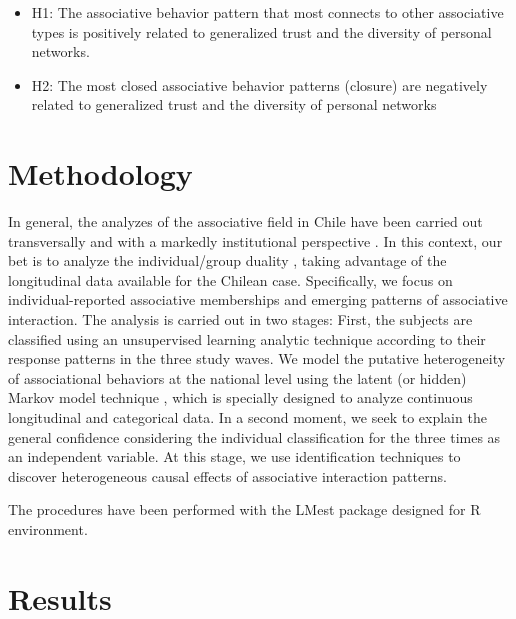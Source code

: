 \begin{itemize}
  \item H1: The associative behavior pattern that most connects to other associative types is positively related to generalized trust and the diversity of personal networks. 
  \item H2: The most closed associative behavior patterns (closure) are negatively related to generalized trust and the diversity of personal networks 
\end{itemize}





\section{Methodology}

In general, the analyzes of the associative field in Chile have been carried out transversally and with a markedly institutional perspective \parencite{irarrazaval_chile_2017,irarrazaval_sociedad_2017, programa_de_las_naciones_unidas_para_el_desarrollo_desarrollo_2000}. In this context, our bet is to analyze the individual/group duality \parencite{breiger_duality_1974, mcpherson_hypernetwork_1982}, taking advantage of the longitudinal data available for the Chilean case. Specifically, we focus on individual-reported associative memberships and emerging patterns of associative interaction. The analysis is carried out in two stages: First, the subjects are classified using an unsupervised learning analytic technique \parencite{molina_machine_2019} according to their response patterns in the three study waves. We model the putative heterogeneity of associational behaviors at the national level using the latent (or hidden) Markov model technique \parencite{bartolucci_latent_2015}, which is specially designed to analyze continuous longitudinal and categorical data. In a second moment, we seek to explain the general confidence considering the individual classification for the three times as an independent variable.  At this stage, we use identification techniques to discover heterogeneous causal effects of associative interaction patterns.
\bigskip



The procedures have been performed with the LMest package \parencite{bartolucci_lmest_2020} designed for R environment. 


\section{Results}

